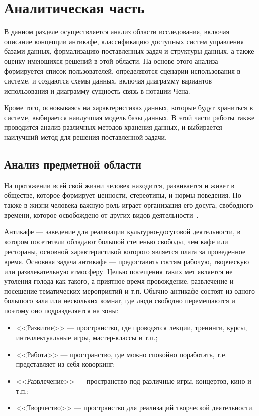 \chapter{Аналитическая часть}

В данном разделе осуществляется анализ области исследования, включая описание концепции антикафе, классификацию доступных систем управления базами данных, формализацию поставленных задач и структуры данных, а также оценку имеющихся решений в этой области. На основе этого анализа формируется список пользователей, определяются сценарии использования в системе, и создаются схемы данных, включая диаграмму вариантов использования и диаграмму сущность-связь в нотации Чена.

Кроме того, основываясь на характеристиках данных, которые будут храниться в системе, выбирается наилучшая модель базы данных. В этой части работы также проводится анализ различных методов хранения данных, и выбирается наилучший метод для решения поставленной задачи.

\section{Анализ предметной области}

На протяжении всей свой жизни человек находится, развивается и живет в обществе, которое формирует ценности, стереотипы, и нормы поведения.
Но также в жизни человека важную роль играет организация его досуга, свободного времени, которое освобождено от других видов деятельности~\cite{anticafe-login}.

Антикафе --- заведение для реализации культурно-досуговой деятельности, в котором посетители обладают большой степенью свободы, чем кафе или рестораны, основной характеристикой которого является плата за проведенное время. 
Основная задача антикафе --- предоставить гостям рабочую, творческую или развлекательную атмосферу. 
Целью посещения таких мет является не утоления голода как такого, а приятное время провождение, развлечение и посещение тематических мероприятий и т.п.
Обычно антикафе состоят из одного большого зала или нескольких комнат, где люди свободно перемещаются и поэтому оно подразделяется на зоны:
\begin{itemize}
	\item <<Развитие>> --- пространство, где проводятся лекции, тренинги, курсы, интеллектуальные игры, мастер-классы и т.п.;
	\item <<Работа>> --- пространство, где можно спокойно поработать, т.е. представляет из себя коворкинг;
	\item <<Развлечение>> --- пространство под различные игры, концертов, кино и т.п.;
	\item <<Творчество>> --- пространство для реализаций творческой деятельности.
\end{itemize}

